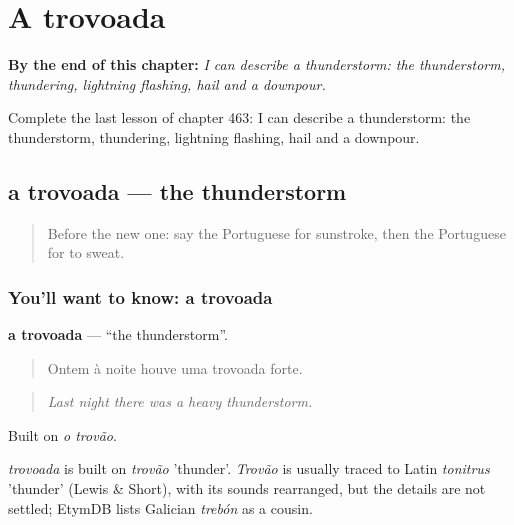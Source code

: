 
\chapter{A trovoada}
\label{ch:pt-a-trovoada}

\begin{chapteropening}
\textbf{By the end of this chapter:} \emph{I can describe a thunderstorm: the thunderstorm, thundering, lightning flashing, hail and a downpour.}

Complete the last lesson of chapter 463: I can describe a thunderstorm: the thunderstorm, thundering, lightning flashing, hail and a downpour.
\end{chapteropening}

\section[a trovoada]{a trovoada — the thunderstorm}

\label{lesson:PT-C463-trovoada}



\begin{quote}
Before the new one: say the Portuguese for sunstroke, then the Portuguese for to sweat.
\end{quote}

\subsection*{You'll want to know: a trovoada}
\textbf{a trovoada} — \textquotedblleft{}the thunderstorm\textquotedblright{}.

\begin{quote}
Ontem à noite houve uma trovoada forte.
\end{quote}

\begin{quote}
\emph{Last night there was a heavy thunderstorm.}
\end{quote}

Built on \emph{o trovão}.

\begin{cousinweb}
\emph{trovoada} is built on \emph{trovão} 'thunder'. \emph{Trovão} is usually traced to Latin \emph{tonitrus} 'thunder' (Lewis \& Short), with its sounds rearranged, but the details are not settled; EtymDB lists Galician \emph{trebón} as a cousin.
\end{cousinweb}

